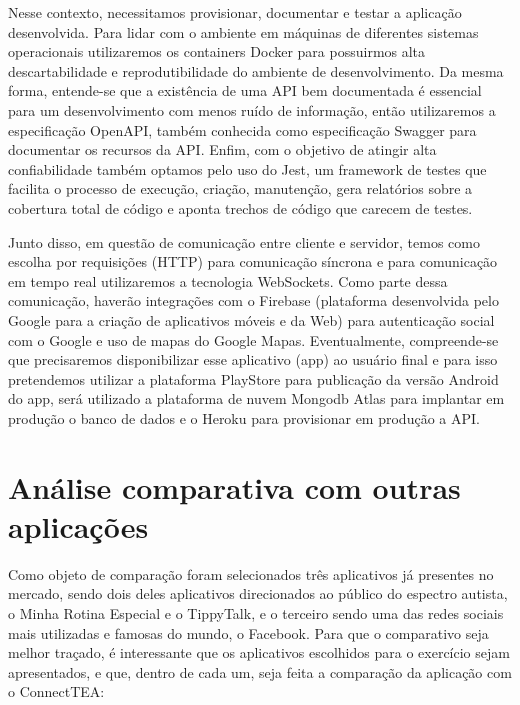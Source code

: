 \begin{apendicesenv}
Nesse contexto, necessitamos provisionar, documentar e testar a aplicação desenvolvida. Para lidar com o ambiente em máquinas de diferentes sistemas operacionais utilizaremos os containers Docker para possuirmos alta descartabilidade e reprodutibilidade do ambiente de desenvolvimento. Da mesma forma, entende-se que a existência de uma API bem documentada é essencial para um desenvolvimento com menos ruído de informação, então utilizaremos a especificação OpenAPI, também conhecida como especificação Swagger para documentar os recursos da API. Enfim, com o objetivo de atingir alta confiabilidade também optamos pelo uso do Jest, um framework de testes que facilita o processo de execução, criação, manutenção, gera relatórios sobre a cobertura total de código e aponta trechos de código que carecem de testes.

Junto disso, em questão de comunicação entre cliente e servidor, temos como escolha por requisições (HTTP) para comunicação síncrona e para comunicação em tempo real utilizaremos a tecnologia WebSockets. Como parte dessa comunicação, haverão integrações com o Firebase (plataforma desenvolvida pelo Google para a criação de aplicativos móveis e da Web) para autenticação social com o Google e uso de mapas do Google Mapas.
Eventualmente, compreende-se que precisaremos disponibilizar esse aplicativo (app) ao usuário final e para isso pretendemos utilizar a plataforma PlayStore para publicação da versão Android do app, será utilizado a plataforma de nuvem Mongodb Atlas para implantar em produção o banco de dados e o Heroku para provisionar em produção a API.



\section{Análise comparativa com outras aplicações}
Como objeto de comparação foram selecionados três aplicativos já presentes no mercado, sendo dois deles aplicativos direcionados ao público do espectro autista, o Minha Rotina Especial e o TippyTalk, e o terceiro sendo uma das redes sociais mais utilizadas e famosas do mundo, o Facebook.
Para que o comparativo seja melhor traçado, é interessante que os aplicativos escolhidos para o exercício sejam apresentados, e que, dentro de cada um, seja feita a comparação da aplicação com o ConnectTEA:


\end{apendicesenv}
